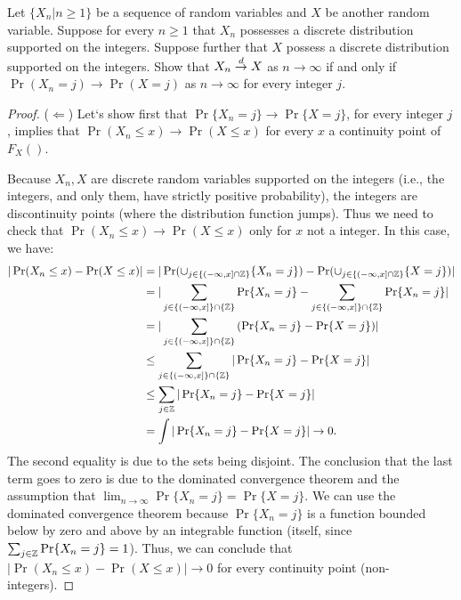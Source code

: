 \documentclass[12pt, letterpaper]{paper}
\begin{document}
\begin{question}
  Let $\{ X_n | n \geq 1 \}$ be a sequence of random variables and $X$ be
  another random variable. Suppose for every $n \geq 1 $ that $X_n$
  possesses a discrete distribution supported on the integers. Suppose
  further that $X$ possess a discrete distribution supported on the
  integers. Show that $X_n \overset{d}{\to} X$ as $n \to \infty$ if and only if
  $\Pr \left(  X_n = j \right ) \to \Pr \left(  X = j \right )$ as $n \to \infty$ for every integer $j$.
  \begin{proof}
    ($\Longleftarrow$) Let`s show first that $\Pr\{X_n=j\}\to\Pr\{X=j\}$, for every
    integer $j$, implies that $\Pr
    (X_n\le x)\to\Pr(X\le x)$ for every $x$ a continuity point of $F_X()$.

Because $X_n,X$ are discrete random variables supported on the integers (i.e., the integers, and only them, have strictly positive probability), the integers are discontinuity points (where the distribution function jumps). Thus we need to check that $\Pr(X_n\le x)\to\Pr(X\le x)$ only for $x$ not a integer. In this case, we have:
\begin{equation}
    \begin{split}
        |\Pr(X_n\le x)-\Pr(X\le x)|&=|\Pr(\cup_{j\in\{(-\infty,x]\cap\mathbb{Z}\}}{\{X_n=j\}})-\Pr(\cup_{j\in\{(-\infty,x]\cap\mathbb{Z}\}}{\{X=j\}})|\\
        &=|\sum_{j\in\{(-\infty,x]\}\cap\{\mathbb{Z}\}}{\Pr\{X_n=j\}}-\sum_{j\in\{(-\infty,x]\}\cap\{\mathbb{Z}\}}{\Pr\{X_n=j\}}|\\
        &=|\sum_{j\in\{(-\infty,x]\}\cap\{\mathbb{Z}\}}{(\Pr\{X_n=j\}-\Pr\{X=j\})}|\\
        &\le \sum_{j\in\{(-\infty,x]\}\cap\{\mathbb{Z}\}}{|\Pr\{X_n=j\}-\Pr\{X=j\}|}\\
        &\le \sum_{j\in\mathbb{Z}}{|\Pr\{X_n=j\}-\Pr\{X=j\}|}\\
        &=\int{|\Pr\{X_n=j\}-\Pr\{X=j\}|}\to 0.
    \end{split}
\end{equation}
\noindent The second equality is due to the sets being disjoint. The conclusion that the last term goes to zero is due to the dominated convergence theorem and the assumption that $\lim_{n\to\infty}{\Pr\{X_n=j\}}=\Pr\{X=j\}$. We can use the dominated convergence theorem because $\Pr\{X_n=j\}$ is a function bounded below by zero and above by an integrable function (itself, since $\sum_{j\in\mathbb{Z}}{\Pr\{X_n=j\}}=1$). Thus, we can conclude that $|\Pr(X_n\le x)-\Pr(X\le x)|\to 0$ for every continuity point (non-integers).


\end{proof}
\end{question}
\end{document}
